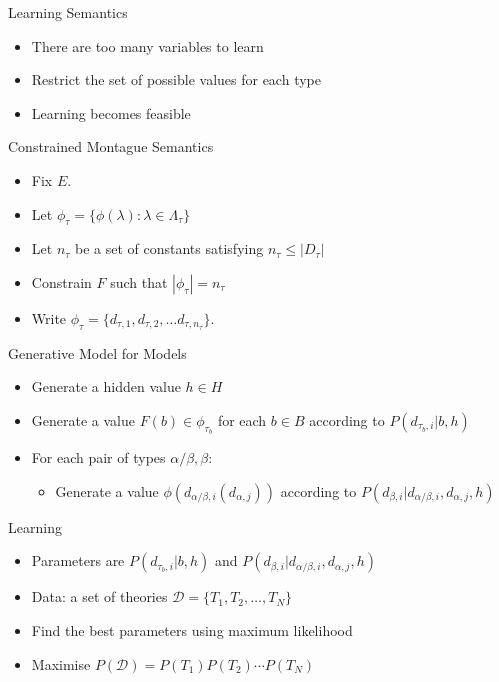 \documentclass{beamer}
\newlength{\wideitemsep}
\let\olditem\item
\renewcommand{\item}{\setlength{\itemsep}{\wideitemsep}\olditem}
\begin{document}
\begin{frame}{Learning Semantics}
  \begin{itemize}
  \item There are too many variables to learn
  \item Restrict the set of possible values for each type
  \item Learning becomes feasible
  \end{itemize}
\end{frame}

\begin{frame}{Constrained Montague Semantics}
\begin{itemize}
\item Fix $E$.
\item Let $\phi_\tau = \{\phi(\lambda) : \lambda\in \Lambda_\tau\}$
\item Let $n_\tau$ be a set of constants satisfying $n_\tau \le |D_\tau|$
\item Constrain $F$ such that $|\phi_\tau| = n_\tau$
\item Write $\phi_\tau = \{d_{\tau,1}, d_{\tau,2}, \ldots d_{\tau,
    n_\tau}\}$.
\end{itemize}
\end{frame}

\begin{frame}{Generative Model for Models}
\begin{itemize}
\item Generate a hidden value $h\in H$
\item Generate a value $F(b) \in \phi_{\tau_b}$ for each $b\in B$ according to
  $P(d_{\tau_b,i}|b, h)$
\item For each pair of types $\alpha/\beta, \beta$:
\begin{itemize}
\item Generate a value $\phi(d_{\alpha/\beta,i}(d_{\alpha,j}))$
  according to $P(d_{\beta,i}|d_{\alpha/\beta,i}, d_{\alpha,j},h)$
\end{itemize}
\end{itemize}
\end{frame}

\begin{frame}{Learning}
  \begin{itemize}
  \item Parameters are $P(d_{\tau_b,i}|b, h)$ and $P(d_{\beta,i}|d_{\alpha/\beta,i}, d_{\alpha,j},h)$
  \item Data: a set of theories $\mathcal{D} = \{T_1, T_2, \ldots, T_N\}$
  \item Find the best parameters using maximum likelihood
  \item Maximise $P(\mathcal{D}) = P(T_1)P(T_2)\cdots P(T_N)$
  \end{itemize}
\end{frame}
\end{document}
